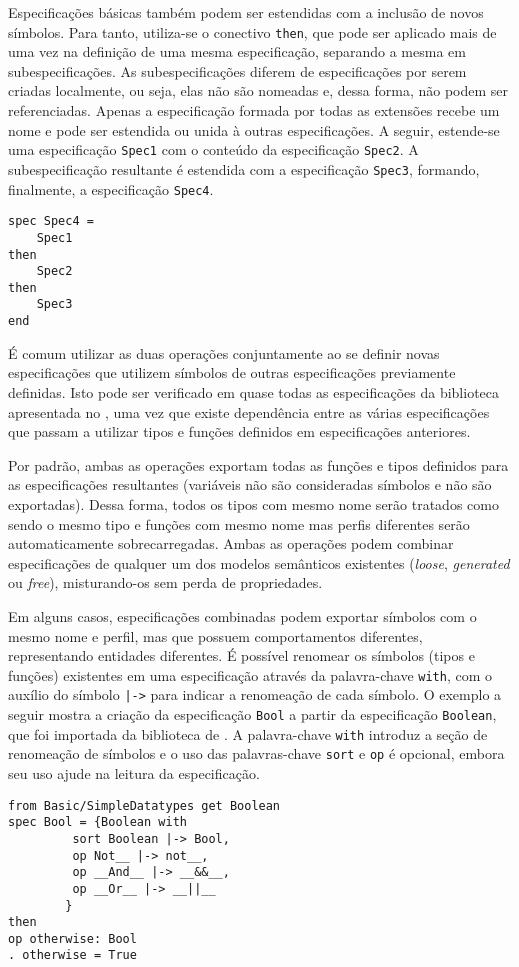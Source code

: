 Especificações básicas também podem ser estendidas com a inclusão de novos símbolos.
Para tanto, utiliza-se o conectivo \Verb.then., que pode ser aplicado mais de uma vez na definição de uma mesma especificação, separando a mesma em subespecificações.
As subespecificações diferem de especificações por serem criadas localmente, ou seja, elas não são nomeadas e, dessa forma, não podem ser referenciadas.
Apenas a especificação formada por todas as extensões recebe um nome e pode ser estendida ou unida à outras especificações.
A seguir, estende-se uma especificação \Verb.Spec1. com o conteúdo da especificação \Verb.Spec2..
A subespecificação resultante é estendida com a especificação \Verb.Spec3., formando, finalmente, a especificação \Verb.Spec4..
\begin{Verbatim}
spec Spec4 =
 	Spec1
then
 	Spec2
then
 	Spec3
end
\end{Verbatim}

É comum utilizar as duas operações conjuntamente ao se definir novas especificações que utilizem símbolos de outras especificações previamente definidas.
Isto pode ser verificado em quase todas as especificações da biblioteca apresentada no , uma vez que existe dependência entre as várias especificações que passam a utilizar tipos e funções definidos em especificações anteriores.

Por padrão, ambas as operações exportam todas as funções e tipos definidos para as especificações resultantes (variáveis não são consideradas símbolos e não são exportadas).
Dessa forma, todos os tipos com mesmo nome serão tratados como sendo o mesmo tipo e funções com mesmo nome mas perfis diferentes serão automaticamente sobrecarregadas.
Ambas as operações podem combinar especificações de qualquer um dos modelos semânticos existentes (\textit{loose}, \textit{generated} ou \textit{free}), misturando-os sem perda de propriedades.

Em alguns casos, especificações combinadas podem exportar símbolos com o mesmo nome e perfil, mas que possuem comportamentos diferentes, representando entidades diferentes.
É possível renomear os símbolos (tipos e funções) existentes em uma especificação através da palavra-chave \Verb.with., com o auxílio do símbolo \Verb.|->. para indicar a renomeação de cada símbolo.
O exemplo a seguir mostra a criação da especificação \Verb.Bool. a partir da especificação \Verb.Boolean., que foi importada da biblioteca de \CASL.
A palavra-chave \Verb.with. introduz a seção de renomeação de símbolos e o uso das palavras-chave \Verb.sort. e \Verb.op. é opcional, embora seu uso ajude na leitura da especificação.
\begin{Verbatim}
from Basic/SimpleDatatypes get Boolean
spec Bool = {Boolean with 
         sort Boolean |-> Bool,
         op Not__ |-> not__,
         op __And__ |-> __&&__,
         op __Or__ |-> __||__
        }
then
op otherwise: Bool
. otherwise = True
\end{Verbatim}

